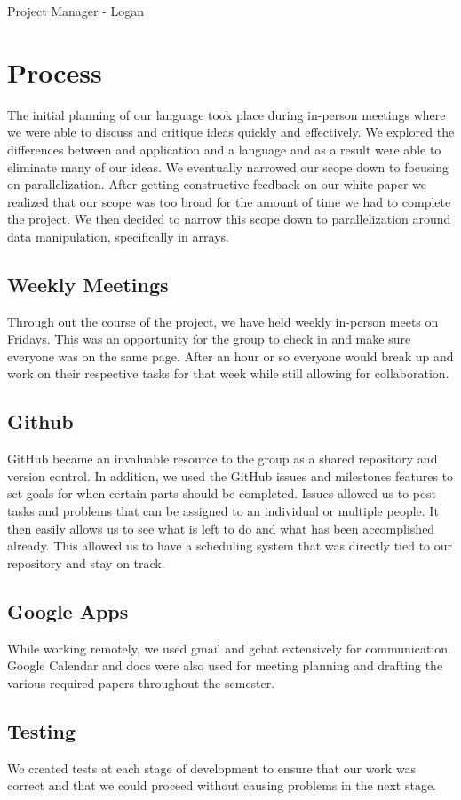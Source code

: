 Project Manager - Logan

\section{Process}
The initial planning of our language took place during in-person meetings where we were able to discuss and critique ideas quickly and effectively. We explored the differences between and application and a language and as a result were able to eliminate many of our ideas. We eventually narrowed our scope down to focusing on parallelization. After getting constructive feedback on our white paper we realized that our scope was too broad for the amount of time we had to complete the project. We then decided to narrow this scope down to parallelization around data manipulation, specifically in arrays. 
\subsection{Weekly Meetings}
Through out the course of the project, we have held weekly in-person meets on Fridays. This was an opportunity for the group to check in and make sure everyone was on the same page. After an hour or so everyone would break up and work on their respective tasks for that week while still allowing for collaboration. 
\subsection{Github}
GitHub became an invaluable resource to the group as a shared repository and version control. In addition, we used the GitHub issues and milestones features to set goals for when certain parts should be completed.  Issues allowed us to post tasks and problems that can be assigned to an individual or multiple people. It then easily allows us to see what is left to do and what has been accomplished already. This allowed us to have a scheduling system that was directly tied to our repository and stay on track.
\subsection{Google Apps}
While working remotely, we used gmail and gchat extensively for communication. Google Calendar and docs were also used for meeting planning and drafting the various required papers throughout the semester.
\subsection{Testing}
We created tests at each stage of development to ensure that our work was correct and that we could proceed without causing problems in the next stage.

